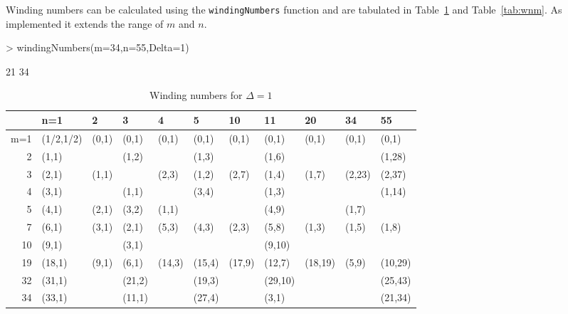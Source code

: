 \documentclass[a4paper]{article}
\begin{document}
Winding numbers can be calculated using the \texttt{windingNumbers} function and are tabulated in Table~\ref{tab:wnp} and Table~\ref{tab:wnm}. As implemented it extends the range of $m$ and $n$.
\begin{Schunk}
\begin{Sinput}
> windingNumbers(m=34,n=55,Delta=1)
\end{Sinput}
\begin{Soutput}
[1] 21 34
\end{Soutput}
\end{Schunk}



\begin{table}[ht]
\centering
\begin{tabular}{rllllllllll}
  \hline
 & n=1 & 2 & 3 & 4 & 5 & 10 & 11 & 20 & 34 & 55 \\ 
  \hline
m=1 & (1/2,1/2) & (0,1) & (0,1) & (0,1) & (0,1) & (0,1) & (0,1) & (0,1) & (0,1) & (0,1) \\ 
  2 & (1,1) &  & (1,2) &  & (1,3) &  & (1,6) &  &  & (1,28) \\ 
  3 & (2,1) & (1,1) &  & (2,3) & (1,2) & (2,7) & (1,4) & (1,7) & (2,23) & (2,37) \\ 
  4 & (3,1) &  & (1,1) &  & (3,4) &  & (1,3) &  &  & (1,14) \\ 
  5 & (4,1) & (2,1) & (3,2) & (1,1) &  &  & (4,9) &  & (1,7) &  \\ 
  7 & (6,1) & (3,1) & (2,1) & (5,3) & (4,3) & (2,3) & (5,8) & (1,3) & (1,5) & (1,8) \\ 
  10 & (9,1) &  & (3,1) &  &  &  & (9,10) &  &  &  \\ 
  19 & (18,1) & (9,1) & (6,1) & (14,3) & (15,4) & (17,9) & (12,7) & (18,19) & (5,9) & (10,29) \\ 
  32 & (31,1) &  & (21,2) &  & (19,3) &  & (29,10) &  &  & (25,43) \\ 
  34 & (33,1) &  & (11,1) &  & (27,4) &  & (3,1) &  &  & (21,34) \\ 
   \hline
\end{tabular}
\caption{Winding numbers for $\Delta=1$} 
\label{tab:wnp}
\end{table}%
\end{document}
